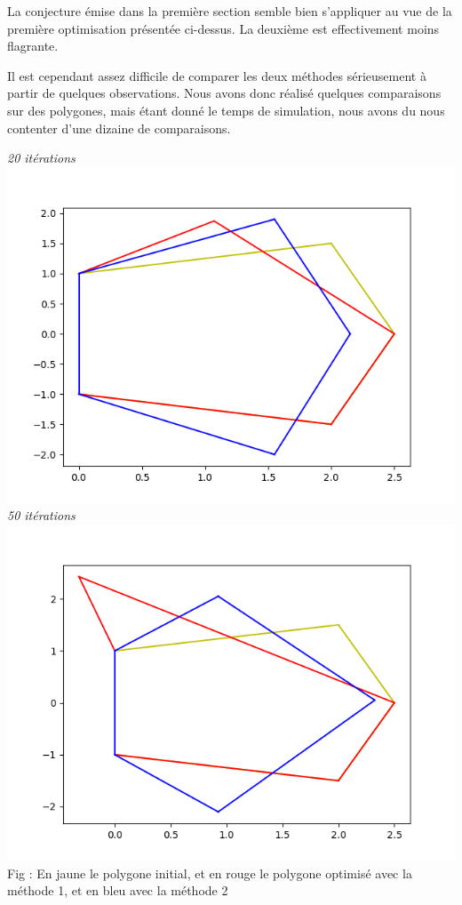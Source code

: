 \documentclass[a4paper,reqno]{article}
\begin{document}
\vspace{2cm}

\par La conjecture émise dans la première section semble bien s'appliquer au vue de la première optimisation présentée ci-dessus. La deuxième est effectivement moins flagrante. \\ 

\par Il est cependant assez difficile de comparer les deux méthodes sérieusement à partir de quelques observations. Nous avons donc réalisé quelques comparaisons sur des polygones, mais étant donné le temps de simulation, nous avons du nous contenter d'une dizaine de comparaisons. \\

\newpage
\begin{center}
	\textit{20 itérations}\\
	\includegraphics[scale=0.45]{comp1.png}\\
	\textit{50 itérations}\\
	\includegraphics[scale=0.45]{comp2.png}\\
	Fig : En jaune le polygone initial, et en rouge le polygone optimisé avec la méthode 1, et en bleu avec la méthode 2
\end{center}
\end{document}
